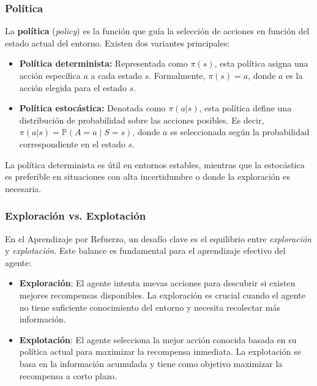 \documentclass[a4paper,12pt, twoside]{report}
\begin{document}
\subsubsection{Política}

La \textbf{política} (\textit{policy}) es la función que guía la selección de acciones en función del estado actual del entorno. Existen dos variantes principales:

\begin{itemize}
    \item \textbf{Política determinista:} Representada como $\pi(s)$, esta política asigna una acción específica $a$ a cada estado $s$. Formalmente, $\pi(s) = a$, donde $a$ es la acción elegida para el estado $s$.

    \item \textbf{Política estocástica:} Denotada como $\pi(a|s)$, esta política define una distribución de probabilidad sobre las acciones posibles. Es decir, $\pi(a|s) = \mathbb{P}(A = a \mid S = s)$, donde $a$ es seleccionada según la probabilidad correspondiente en el estado $s$.
\end{itemize}

La política determinista es útil en entornos estables, mientras que la estocástica es preferible en situaciones con alta incertidumbre o donde la exploración es necesaria.


\subsubsection{Exploración vs. Explotación}

En el Aprendizaje por Refuerzo, un desafío clave es el equilibrio entre \textit{exploración} y 
\textit{explotación}. Este balance es fundamental para el aprendizaje efectivo del agente:

\begin{itemize}
    \item \textbf{Exploración}: El agente intenta nuevas acciones para descubrir si existen mejores 
    recompensas disponibles. La exploración es crucial cuando el agente no tiene suficiente conocimiento 
    del entorno y necesita recolectar más información.
    \item \textbf{Explotación}: El agente selecciona la mejor acción conocida basada en su 
    política actual para maximizar la recompensa inmediata. La explotación se basa en la información 
    acumulada y tiene como objetivo maximizar la recompensa a corto plazo.
\end{itemize}
\end{document}
